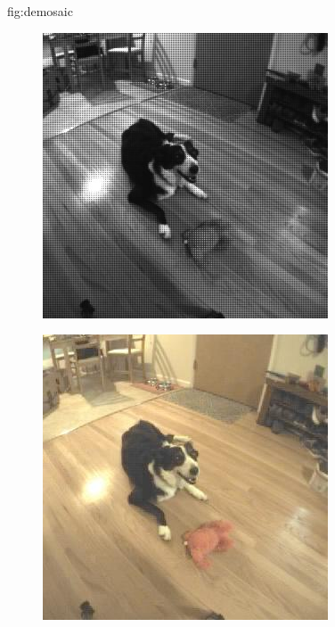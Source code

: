 \begin{definefigure}{fig:demosaic}
\centering
\begin{subfigure}{0.49\columnwidth}
\includegraphics[width=\columnwidth]{figs/permacam/mosaic.jpeg}
\end{subfigure}
%
\begin{subfigure}{0.49\columnwidth}
\includegraphics[width=\columnwidth]{figs/permacam/demosaic.jpeg}
\end{subfigure}
\caption{}
\end{definefigure}

